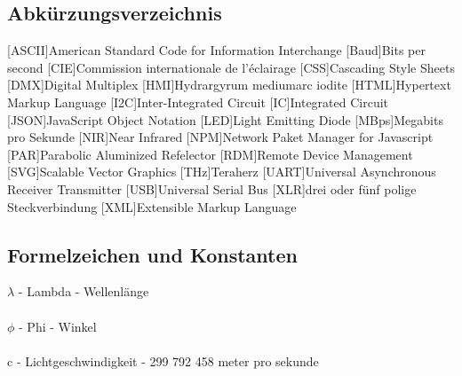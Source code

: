 \documentclass[11pt]{scrartcl}
\begin{document}
{\subsection{Abkürzungsverzeichnis}
\begin{acronym}
    [ASCII]{American Standard Code for Information Interchange}
    [Baud]{Bits per second}
    [CIE]{Commission internationale de l’éclairage}
    [CSS]{Cascading Style Sheets}
    [DMX]{Digital Multiplex}
    [HMI]{Hydrargyrum mediumarc iodite}
    [HTML]{Hypertext Markup Language}
    [I2C]{Inter-Integrated Circuit}
    [IC]{Integrated Circuit}
    [JSON]{JavaScript Object Notation}
    [LED]{Light Emitting Diode}
    [MBps]{Megabits pro Sekunde}
    [NIR]{Near Infrared}
    [NPM]{Network Paket Manager for Javascript}
    [PAR]{Parabolic Aluminized Refelector}
    [RDM]{Remote Device Management}
    [SVG]{Scalable Vector Graphics}
    [THz]{Teraherz}
    [UART]{Universal Asynchronous Receiver Transmitter}
    [USB]{Universal Serial Bus}
    [XLR]{drei oder fünf polige Steckverbindung}
    [XML]{Extensible Markup Language}
\end{acronym}
\clearpage

\subsection{Formelzeichen und Konstanten}
$\lambda$ - Lambda - Wellenlänge\\
\\
$\phi$ - Phi - Winkel\\
\\
c - Lichtgeschwindigkeit - 299 792 458 meter pro sekunde
\clearpage

}
\end{document}
